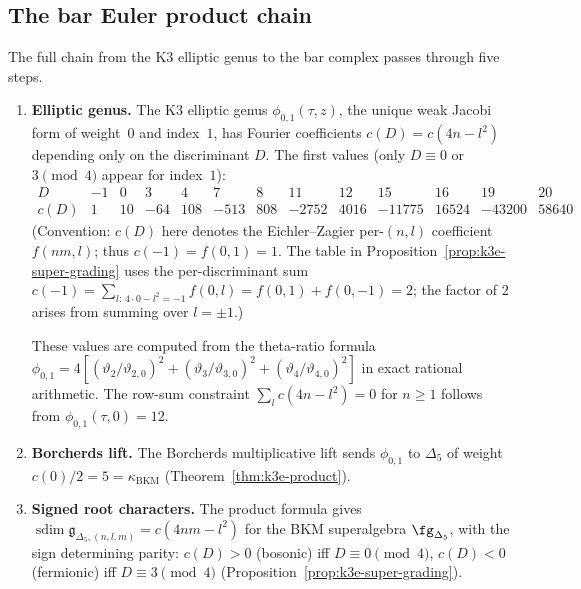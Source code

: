 \subsection{The bar Euler product chain}
\label{subsec:k3e-bar-euler-chain}

The full chain from the K3 elliptic genus to the bar complex
passes through five steps.

\begin{enumerate}[label=\textup{Step \arabic*.}]
\item \textbf{Elliptic genus.}
The K3 elliptic genus $\phi_{0,1}(\tau, z)$,
the unique weak Jacobi form of weight~$0$ and index~$1$,
has Fourier coefficients $c(D) = c(4n - l^2)$
depending only on the discriminant $D$.
The first values (only $D \equiv 0$ or $3 \pmod{4}$ appear
for index~$1$):
\[
\begin{array}{c|cccccccccccc}
D & -1 & 0 & 3 & 4 & 7 & 8 & 11 & 12 & 15 & 16 & 19 & 20 \\
\hline
c(D) & 1 & 10 & -64 & 108 & -513 & 808 & -2752 & 4016 & -11775 & 16524 & -43200 & 58640
\end{array}
\]
(Convention: $c(D)$ here denotes the Eichler--Zagier per-$(n,l)$ coefficient $f(nm,l)$; thus $c(-1) = f(0,1) = 1$. The table in Proposition~\ref{prop:k3e-super-grading} uses the per-discriminant sum $c(-1) = \sum_{l:\,4 \cdot 0 - l^2 = -1} f(0,l) = f(0,1) + f(0,-1) = 2$; the factor of $2$ arises from summing over $l = \pm 1$.)

These values are computed from the theta-ratio formula
$\phi_{0,1} = 4[(\vartheta_2/\vartheta_{2,0})^2 + (\vartheta_3/\vartheta_{3,0})^2 + (\vartheta_4/\vartheta_{4,0})^2]$
in exact rational arithmetic.
The row-sum constraint
$\sum_l c(4n - l^2) = 0$ for $n \geq 1$
follows from $\phi_{0,1}(\tau, 0) = 12$.

\item \textbf{Borcherds lift.}
The Borcherds multiplicative lift sends $\phi_{0,1}$ to $\Delta_5$
of weight $c(0)/2 = 5 = \kappa_{\mathrm{BKM}}$
(Theorem~\ref{thm:k3e-product}).

\item \textbf{Signed root characters.}
The product formula gives
$\operatorname{sdim}\mathfrak g_{\Delta_5,(n,l,m)} = c(4nm - l^2)$ for the BKM superalgebra
$\fg_{\Delta_5}$, with the sign determining parity:
$c(D) > 0$ (bosonic) iff $D \equiv 0 \pmod{4}$,
$c(D) < 0$ (fermionic) iff $D \equiv 3 \pmod{4}$
(Proposition~\ref{prop:k3e-super-grading}).


\end{enumerate}
